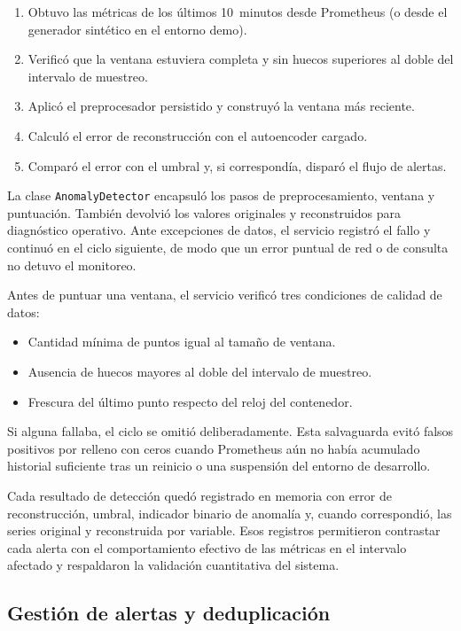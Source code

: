 \begin{enumerate}
\item Obtuvo las métricas de los últimos 10~minutos desde Prometheus (o desde el generador sintético en el entorno demo).
\item Verificó que la ventana estuviera completa y sin huecos superiores al doble del intervalo de muestreo.
\item Aplicó el preprocesador persistido y construyó la ventana más reciente.
\item Calculó el error de reconstrucción con el autoencoder cargado.
\item Comparó el error con el umbral y, si correspondía, disparó el flujo de alertas.
\end{enumerate}

La clase \texttt{AnomalyDetector} encapsuló los pasos de preprocesamiento, ventana y puntuación. También devolvió los valores originales y reconstruidos para diagnóstico operativo. Ante excepciones de datos, el servicio registró el fallo y continuó en el ciclo siguiente, de modo que un error puntual de red o de consulta no detuvo el monitoreo.

Antes de puntuar una ventana, el servicio verificó tres condiciones de calidad de datos:

\begin{itemize}
\item Cantidad mínima de puntos igual al tamaño de ventana.
\item Ausencia de huecos mayores al doble del intervalo de muestreo.
\item Frescura del último punto respecto del reloj del contenedor.
\end{itemize}

Si alguna fallaba, el ciclo se omitió deliberadamente. Esta salvaguarda evitó falsos positivos por relleno con ceros cuando Prometheus aún no había acumulado historial suficiente tras un reinicio o una suspensión del entorno de desarrollo.

Cada resultado de detección quedó registrado en memoria con error de reconstrucción, umbral, indicador binario de anomalía y, cuando correspondió, las series original y reconstruida por variable. Esos registros permitieron contrastar cada alerta con el comportamiento efectivo de las métricas en el intervalo afectado y respaldaron la validación cuantitativa del sistema.

\subsection{Gestión de alertas y deduplicación}

